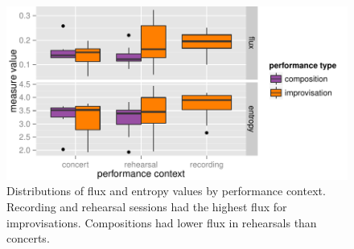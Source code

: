 \documentclass{sigchi}
\begin{document}
\begin{figure} \centering
  \includegraphics[width=\linewidth]{figures/context-flux-entropy-boxplot}
  \caption{Distributions of flux and entropy values by performance
context. Recording and rehearsal sessions had the highest flux for
improvisations. Compositions had lower
flux in rehearsals than concerts.
\label{fig:flux-entropy-boxplot}}
\end{figure}
\end{document}
